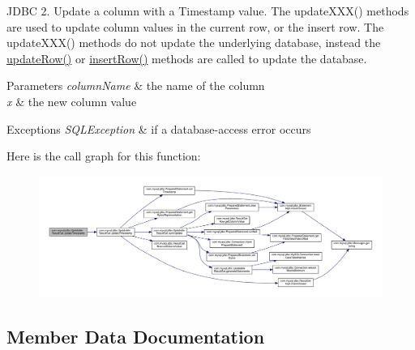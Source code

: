 J\+D\+BC 2. Update a column with a Timestamp value. The update\+X\+X\+X() methods are used to update column values in the current row, or the insert row. The update\+X\+X\+X() methods do not update the underlying database, instead the \mbox{\hyperlink{classcom_1_1mysql_1_1jdbc_1_1_updatable_result_set_a919969ba4b3c7cbc7b18605e9f31a746}{update\+Row()}} or \mbox{\hyperlink{classcom_1_1mysql_1_1jdbc_1_1_updatable_result_set_aef041f8d9d0778083716fc26652648fa}{insert\+Row()}} methods are called to update the database.


\begin{DoxyParams}{Parameters}
{\em column\+Name} & the name of the column \\
\hline
{\em x} & the new column value\\
\hline
\end{DoxyParams}

\begin{DoxyExceptions}{Exceptions}
{\em S\+Q\+L\+Exception} & if a database-\/access error occurs \\
\hline
\end{DoxyExceptions}
Here is the call graph for this function\+:
\nopagebreak
\begin{figure}[H]
\begin{center}
\leavevmode
\includegraphics[width=350pt]{classcom_1_1mysql_1_1jdbc_1_1_updatable_result_set_a76ddad6df768c73381a9cdb2797aeba4_cgraph}
\end{center}
\end{figure}


\subsection{Member Data Documentation}
\mbox{\label{classcom_1_1mysql_1_1jdbc_1_1_updatable_result_set_a364f682dfe9945353fce651536140e46}} 
